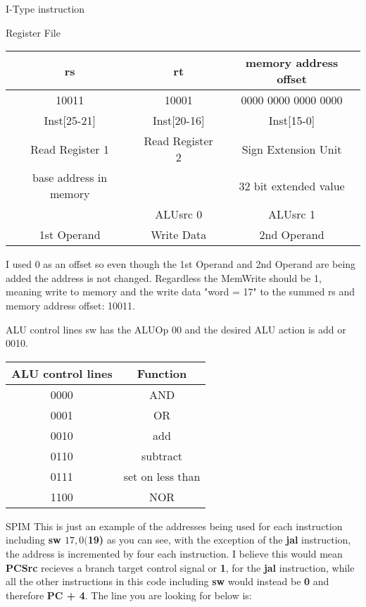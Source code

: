 \documentclass[landscape,fontscale=1,margin=0.2cm,paperwidth=50truecm, paperheight=34truecm,debug]{baposter}
\begin{document}
\begin{poster}
\begin{posterbox}[column=0,below=auto,textborder=rounded]{I-Type instruction}
\begin{center}
\end{center}
\end{posterbox}
\begin{posterbox}[column=0,textborder=rounded,below=auto]{Register File}
\begin{center}
\begin{tabular}{|c|c|c|}\hline
rs& rt & memory address offset\\\hline
10011 & 10001 & 0000 0000 0000 0000\\\hline
Inst[25-21] & Inst[20-16] & Inst[15-0]\\\hline
Read Register 1 & Read Register 2 & Sign Extension Unit\\\hline
base address in memory & & 32 bit extended value\\\hline
& ALUsrc 0 & ALUsrc 1\\\hline
1st Operand&Write Data&2nd Operand\\\hline
\end{tabular}
\end{center}
I used 0 as an offset so even though the 1st Operand and 2nd Operand are being added the address is not changed. Regardless the MemWrite should be 1, meaning write to memory and the write data "word = 17" to the summed rs and memory address offset: 10011.
\end{posterbox}
\begin{posterbox}[column=0,below=auto,textborder=rounded]{ALU control lines}
sw has the ALUOp 00 and the desired ALU action is add or 0010.
\begin{center}
\begin{tabular}{|c|c|}
\hline
ALU control lines & Function\\\hline
0000 & AND\\\hline
0001 & OR\\\hline
0010 & add\\\hline
0110 & subtract\\\hline
0111 & set on less than\\\hline
1100 & NOR\\\hline
\end{tabular}
\end{center}
\end{posterbox}
\begin{posterbox}[column=1,textborder=rounded]{SPIM}
This is just an example of the addresses being used for each instruction including \textbf{sw $17, 0($19)} as you can see, with the exception of the \textbf{jal} instruction, the address is incremented by four each instruction. I believe this would mean \textbf{PCSrc} recieves a branch target control signal or \textbf{1}, for the \textbf{jal} instruction, while all the other instructions in this code including \textbf{sw} would instead be \textbf{0} and therefore \textbf{PC + 4}. The line you are looking for below is:\\

\end{posterbox}
\end{poster}
\end{document}
